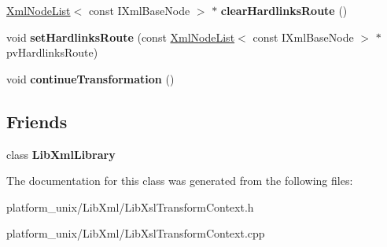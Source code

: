 \begin{DoxyCompactItemize}
\item 
\hypertarget{classgeneral__server_1_1LibXslTransformContext_aadc6ce7cd4eff7349f0cded124d7573e}{\hyperlink{classgeneral__server_1_1XmlNodeList}{\-Xml\-Node\-List}$<$ const \-I\-Xml\-Base\-Node $>$ $\ast$ {\bfseries clear\-Hardlinks\-Route} ()}\label{classgeneral__server_1_1LibXslTransformContext_aadc6ce7cd4eff7349f0cded124d7573e}

\item 
\hypertarget{classgeneral__server_1_1LibXslTransformContext_a41f8a5679924a407d8f62d1224ea5401}{void {\bfseries set\-Hardlinks\-Route} (const \hyperlink{classgeneral__server_1_1XmlNodeList}{\-Xml\-Node\-List}$<$ const \-I\-Xml\-Base\-Node $>$ $\ast$pv\-Hardlinks\-Route)}\label{classgeneral__server_1_1LibXslTransformContext_a41f8a5679924a407d8f62d1224ea5401}

\item 
\hypertarget{classgeneral__server_1_1LibXslTransformContext_abe5588679db871154349b2f0a7c7c71f}{void {\bfseries continue\-Transformation} ()}\label{classgeneral__server_1_1LibXslTransformContext_abe5588679db871154349b2f0a7c7c71f}

\end{DoxyCompactItemize}
\subsection*{\-Friends}
\begin{DoxyCompactItemize}
\item 
\hypertarget{classgeneral__server_1_1LibXslTransformContext_ab76a8c8b514e08e13c811de729a94ce4}{class {\bfseries \-Lib\-Xml\-Library}}\label{classgeneral__server_1_1LibXslTransformContext_ab76a8c8b514e08e13c811de729a94ce4}

\end{DoxyCompactItemize}


\-The documentation for this class was generated from the following files\-:\begin{DoxyCompactItemize}
\item 
platform\-\_\-unix/\-Lib\-Xml/\-Lib\-Xsl\-Transform\-Context.\-h\item 
platform\-\_\-unix/\-Lib\-Xml/\-Lib\-Xsl\-Transform\-Context.\-cpp\end{DoxyCompactItemize}
